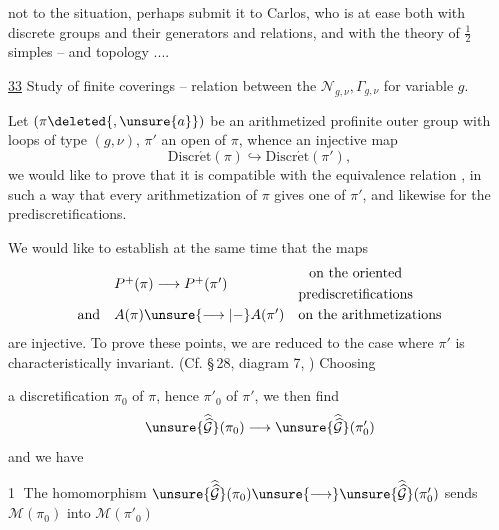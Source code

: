 
not to the situation, perhaps submit it to Carlos, who is at ease both with discrete groups and their generators and relations, and with the theory of $\frac{1}{2}$ simples -- and topology ....


\uline{33} Study of finite coverings -- relation between the $\mathcal N_{g,\nu},\Gamma_{g,\nu}$ for variable $g$.

Let $(\pi\deleted{,\unsure{a}})$ be an arithmetized profinite outer group with loops of type $(g,\nu)$, $\pi'$ an open  of $\pi$, whence an injective map
\[
\mathrm{Discr\acute{e}t}(\pi)\hookrightarrow
\mathrm{Discr\acute{e}t}(\pi'),
\]
we would like to prove that it is compatible with the equivalence relation , in  such a way that every arithmetization of $\pi$ gives one of $\pi'$, and likewise for the  prediscretifications.

We would like to establish at the same time that the maps
\[
\begin{array}{lll}
 &P^+(\pi)\longrightarrow P^+(\pi')&\begin{gathered}\text{on the oriented}\\\text{prediscretifications}\end{gathered}\\[1em]
\text{and}&A(\pi)\unsure{\longrightarrow|-}A(\pi')&\text{on the arithmetizations}
\end{array}
\]
are injective. To prove these points, we are reduced to the case where $\pi'$ is characteristically invariant. (Cf. \S\,28, diagram 7, ) Choosing


a discretification $\pi_0$ of $\pi$, hence $\pi'_0$ of $\pi'$, we then find
\[
\unsure{\widehat{\widehat{\mathcal G}}}(\pi_0)\longrightarrow
\unsure{\widehat{\widehat{\mathcal G}}}(\pi'_0)
\]
and we have

\textcircled{1} The homomorphism $\unsure{\widehat{\widehat{\mathcal G}}}(\pi_0)\unsure{\longrightarrow}\unsure{\widehat{\widehat{\mathcal G}}}(\pi'_0)$ sends $\mathcal M(\pi_0)$ into $\mathcal M(\pi'_0)$

